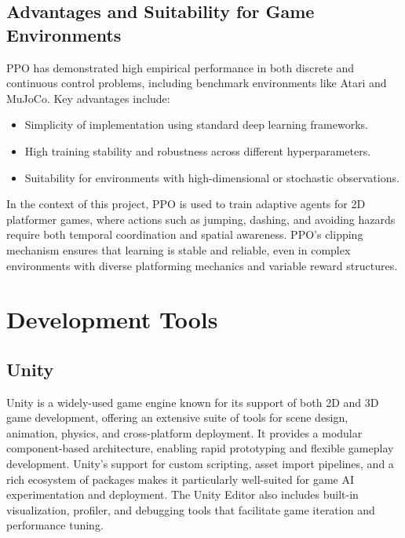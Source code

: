 \documentclass[12pt,oneside,openright,a4paper]{cpe-english-project}
\begin{document}
\subsection{Advantages and Suitability for Game Environments}

PPO has demonstrated high empirical performance in both discrete and continuous control problems, including benchmark environments like Atari and MuJoCo. Key advantages include:
\begin{itemize}
\item Simplicity of implementation using standard deep learning frameworks.
\item High training stability and robustness across different hyperparameters.
\item Suitability for environments with high-dimensional or stochastic observations.
\end{itemize}

In the context of this project, PPO is used to train adaptive agents for 2D platformer games, where actions such as jumping, dashing, and avoiding hazards require both temporal coordination and spatial awareness. PPO’s clipping mechanism ensures that learning is stable and reliable, even in complex environments with diverse platforming mechanics and variable reward structures.

\section{Development Tools}

\subsection{Unity}
Unity is a widely-used game engine known for its support of both 2D and 3D game development, offering an extensive suite of tools for scene design, animation, physics, and cross-platform deployment. It provides a modular component-based architecture, enabling rapid prototyping and flexible gameplay development. Unity's support for custom scripting, asset import pipelines, and a rich ecosystem of packages makes it particularly well-suited for game AI experimentation and deployment. The Unity Editor also includes built-in visualization, profiler, and debugging tools that facilitate game iteration and performance tuning.
\end{document}
